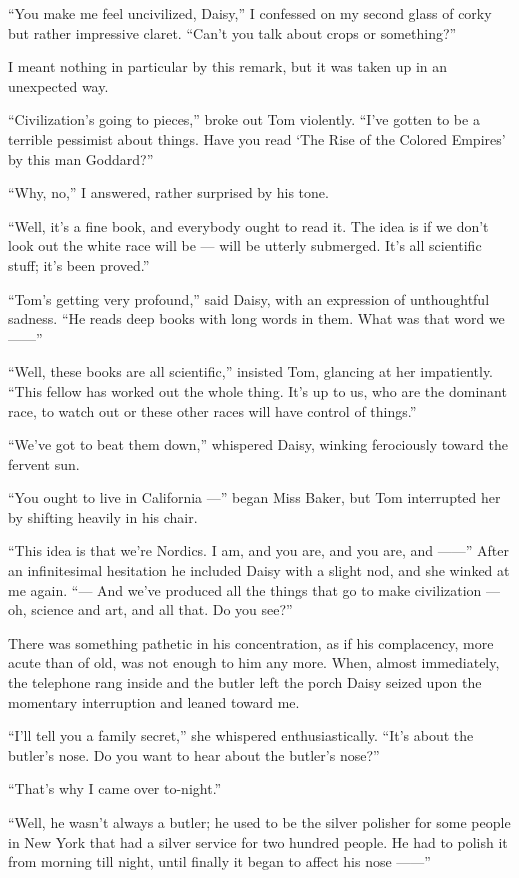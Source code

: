 \documentclass{znotebook}
\begin{document}
``You make me feel uncivilized, Daisy,'' I confessed on my second glass of corky but rather impressive claret. ``Can't you talk about crops or something?''

I meant nothing in particular by this remark, but it was taken up in an unexpected way.

``Civilization's going to pieces,'' broke out Tom violently. ``I've gotten to be a terrible pessimist about things. Have you read ‘The Rise of the Colored Empires' by this man Goddard?''

``Why, no,'' I answered, rather surprised by his tone.

``Well, it's a fine book, and everybody ought to read it. The idea is if we don't look out the white race will be — will be utterly submerged. It's all scientific stuff; it's been proved.''

``Tom's getting very profound,'' said Daisy, with an expression of unthoughtful sadness. ``He reads deep books with long words in them. What was that word we ——''

``Well, these books are all scientific,'' insisted Tom, glancing at her impatiently. ``This fellow has worked out the whole thing. It's up to us, who are the dominant race, to watch out or these other races will have control of things.''

``We've got to beat them down,'' whispered Daisy, winking ferociously toward the fervent sun.

``You ought to live in California —'' began Miss Baker, but Tom interrupted her by shifting heavily in his chair.

``This idea is that we're Nordics. I am, and you are, and you are, and ——'' After an infinitesimal hesitation he included Daisy with a slight nod, and she winked at me again. ``— And we've produced all the things that go to make civilization — oh, science and art, and all that. Do you see?''

There was something pathetic in his concentration, as if his complacency, more acute than of old, was not enough to him any more. When, almost immediately, the telephone rang inside and the butler left the porch Daisy seized upon the momentary interruption and leaned toward me.

``I'll tell you a family secret,'' she whispered enthusiastically. ``It's about the butler's nose. Do you want to hear about the butler's nose?''

``That's why I came over to-night.''

``Well, he wasn't always a butler; he used to be the silver polisher for some people in New York that had a silver service for two hundred people. He had to polish it from morning till night, until finally it began to affect his nose ——''
\end{document}
